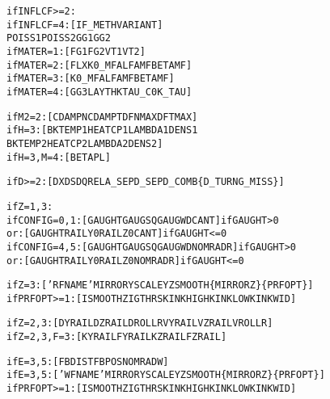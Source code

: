 \documentclass[12pt]{report}
\renewcommand{\magenta}[1]{}
\begin{document}
\begin{alltt}
% Information needed for influence coefficients,
% particularly the material parameters (section \ref{sec:matcns}):

if INFLCF>=2:
      if INFLCF=4: [ IF\_METH  VARIANT               ]
                     POISS1  POISS2  GG1     GG2
\magenta{      if BOUND =1: [ FLXZ                           ]
}      if MATER =1: [ FG1     FG2       VT1     VT2  ]
      if MATER =2: [ FLX     K0\_MF   ALFAMF  BETAMF ]
      if MATER =3: [         K0\_MF   ALFAMF  BETAMF ]
      if MATER =4: [ GG3     LAYTHK  TAU\_C0  K\_TAU  ]

% Material parameters for damping and temperature calculation (section \ref{sec:matcns}):

if M2=2:     [ CDAMPN   CDAMPT   DFNMAX   DFTMAX   ]
if H=3:      [ BKTEMP1  HEATCP1  LAMBDA1  DENS1           
               BKTEMP2  HEATCP2  LAMBDA2  DENS2    ]
if H=3, M=4: [ BETAPL                              ]

% Information needed for the grid discretization (section \ref{sec:wr_potcon}):

if D>=2:     [ DX    DS   DQREL   A\_SEP   D\_SEP   D\_COMB  \{D\_TURN   G\_MISS\} ]

% Information on the track geometry (section \ref{sec:track_geom}) \& rail profile (section \ref{sec:profiles}):

if Z=1,3:
      if CONFIG=0,1:  [  GAUGHT    GAUGSQ   GAUGWD   CANT     ]  if GAUGHT >  0
                 or:  [  GAUGHT    RAILY0   RAILZ0   CANT     ]  if GAUGHT <= 0
      if CONFIG=4,5:  [  GAUGHT    GAUGSQ   GAUGWD   NOMRADR  ]  if GAUGHT >  0
                 or:  [  GAUGHT    RAILY0   RAILZ0   NOMRADR  ]  if GAUGHT <= 0

if Z=3:        [ 'RFNAME'  MIRRORY  SCALEYZ   SMOOTH  \{MIRRORZ\}  \{PRFOPT\} ]
if PRFOPT>=1:  [  ISMOOTH  ZIGTHRS  KINKHIGH  KINKLOW  KINKWID ]
\magenta{if PRFOPT>=2:  [  ERRHND   MAXOMIT  ]}
if Z=2,3:      [  DYRAIL   DZRAIL   DROLLR    VYRAIL   VZRAIL   VROLLR  ]
if Z=2,3, F=3: [  KYRAIL   FYRAIL   KZRAIL    FZRAIL                    ]

% Information on wheelset geometry (section \ref{sec:wheelset_geom}) \& wheel profile (section \ref{sec:profiles}):

if E=3,5:      [  FBDIST   FBPOS     NOMRADW   ] 
if E=3,5:      [ 'WFNAME'  MIRRORY   SCALEYZ   SMOOTH  \{MIRRORZ\}  \{PRFOPT\} ]
if PRFOPT>=1:  [  ISMOOTH  ZIGTHRS   KINKHIGH  KINKLOW  KINKWID ]
\magenta{if PRFOPT>=2:  [  ERRHND   MAXOMIT  ]
}
% Information on the wheelset state (section \ref{sec:wheelset_geom}):


\end{alltt}
\end{document}

